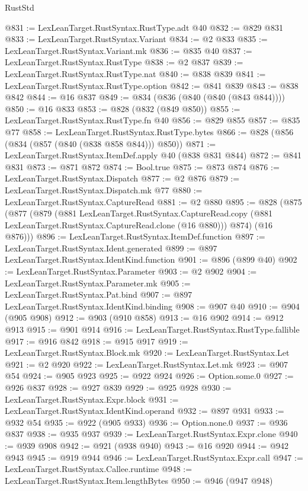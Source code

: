 \begin{lexlean}{RustStd}
\begin{coremodule}
@831 := LexLeanTarget.RustSyntax.RustType.adt @40
@832 := @829 @831
@833 := LexLeanTarget.RustSyntax.Variant
@834 := @2 @833
@835 := LexLeanTarget.RustSyntax.Variant.mk
@836 := @835 @40
@837 := LexLeanTarget.RustSyntax.RustType
@838 := @2 @837
@839 := LexLeanTarget.RustSyntax.RustType.nat
@840 := @838 @839
@841 := LexLeanTarget.RustSyntax.RustType.option
@842 := @841 @839
@843 := @838 @842
@844 := @16 @837
@849 := @834 (@836 (@840 (@840 (@843 @844))))
@850 := @16 @833
@853 := @828 (@832 (@849 @850))
@855 := LexLeanTarget.RustSyntax.RustType.fn @40
@856 := @829 @855
@857 := @835 @77
@858 := LexLeanTarget.RustSyntax.RustType.bytes
@866 := @828 (@856 (@834 (@857 (@840 (@838 @858 @844))) @850))
@871 := LexLeanTarget.RustSyntax.ItemDef.apply @40 (@838 @831 @844)
@872 := @841 @831
@873 := @871 @872
@874 := Bool.true
@875 := @873 @874
@876 := LexLeanTarget.RustSyntax.Dispatch
@877 := @2 @876
@879 := LexLeanTarget.RustSyntax.Dispatch.mk @77
@880 := LexLeanTarget.RustSyntax.CaptureRead
@881 := @2 @880
@895 := @828
    (@875
      (@877
        (@879
          (@881
            LexLeanTarget.RustSyntax.CaptureRead.copy
            (@881 LexLeanTarget.RustSyntax.CaptureRead.clone (@16 @880)))
          @874)
        (@16 @876)))
@896 := LexLeanTarget.RustSyntax.ItemDef.function
@897 := LexLeanTarget.RustSyntax.Ident.generated
@899 := @897 LexLeanTarget.RustSyntax.IdentKind.function
@901 := @896 (@899 @40)
@902 := LexLeanTarget.RustSyntax.Parameter
@903 := @2 @902
@904 := LexLeanTarget.RustSyntax.Parameter.mk
@905 := LexLeanTarget.RustSyntax.Pat.bind
@907 := @897 LexLeanTarget.RustSyntax.IdentKind.binding
@908 := @907 @40
@910 := @904 (@905 @908)
@912 := @903 (@910 @858)
@913 := @16 @902
@914 := @912 @913
@915 := @901 @914
@916 := LexLeanTarget.RustSyntax.RustType.fallible
@917 := @916 @842
@918 := @915 @917
@919 := LexLeanTarget.RustSyntax.Block.mk
@920 := LexLeanTarget.RustSyntax.Let
@921 := @2 @920
@922 := LexLeanTarget.RustSyntax.Let.mk
@923 := @907 @54
@924 := @905 @923
@925 := @922 @924
@926 := Option.some.{0}
@927 := @926 @837
@928 := @927 @839
@929 := @925 @928
@930 := LexLeanTarget.RustSyntax.Expr.block
@931 := LexLeanTarget.RustSyntax.IdentKind.operand
@932 := @897 @931
@933 := @932 @54
@935 := @922 (@905 @933)
@936 := Option.none.{0}
@937 := @936 @837
@938 := @935 @937
@939 := LexLeanTarget.RustSyntax.Expr.clone
@940 := @939 @908
@942 := @921 (@938 @940)
@943 := @16 @920
@944 := @942 @943
@945 := @919 @944
@946 := LexLeanTarget.RustSyntax.Expr.call
@947 := LexLeanTarget.RustSyntax.Callee.runtime
@948 := LexLeanTarget.RustSyntax.Item.lengthBytes
@950 := @946 (@947 @948)

\end{coremodule}
\end{lexlean}
